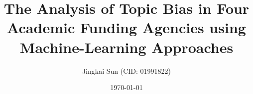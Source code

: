 \documentclass[hidelinks, a4paper, 11pt]{article}
\title{The Analysis of Topic Bias in Four Academic Funding Agencies using Machine-Learning Approaches}
\author{Jingkai Sun (CID: 01991822)}
\date{\today}
\begin{document}

\newpage

\newpage

\newpage

\newpage
\listoffigures
\newpage
\tableofcontents
\linenumbers

\maketitle







\newpage


\end{document}
